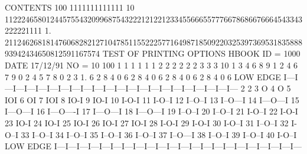 \begin{Listing}
 CONTENTS 100                          1111111111111                                                                
           10                 112224658012445755432099687543222121221233455666557776678686676664543343222221111     
            1.       21124626818147606828212710478511552225771649871850922032539736953183588893942434650812591167574
\newpage\relax TEST OF PRINTING OPTIONS                                                        
 HBOOK     ID =      1000                                        DATE  17/12/91              NO =  10
     100                               1   1   1   1   1   1   2   2   2   2   2   2   3   3   3
      10       1   3   4   6   8   9   1   2   4   6   7   9   0   2   4   5   7   8   0   2   3
       1.      6   2   8   4   0   6   2   8   4   0   6   2   8   4   0   6   2   8   4   0   6
  LOW EDGE I---I---I---I---I---I---I---I---I---I---I---I---I---I---I---I---I---I---I---I---I---I---
     2
     2
     3      O
     4      O
     5      IOI
     6       OI
     7        IOI
     8           IO-I
     9               IO-I
    10                      I-O-I
    11                                I-O--I
    12                                                  I--O--I
    13                                                              I--O---I
    14                                                                        I---O---I
    15                                                                                   I---O---I
    16                                                                             I---O----I
    17                                                                         I---O---I
    18                                                          I---O---I
    19                                                 I--O--I
    20                                       I--O--I
    21                                  I-O--I
    22                        I-O-I
    23                IO-I
    24              IO-I
    25                IO-I
    26                IO-I
    27               IO-I
    28                     I-O-I
    29                           I-O-I
    30                               I-O--I
    31                                  I--O--I
    32                               I-O--I
    33                                        I--O--I
    34                                       I--O--I
    35                                     I--O--I
    36                                        I--O--I
    37                                       I--O---I
    38                                       I--O--I
    39                                     I--O--I
    40                               I-O--I
  LOW EDGE I---I---I---I---I---I---I---I---I---I---I---I---I---I---I---I---I---I---I---I---I---I---
 

\end{Listing}
